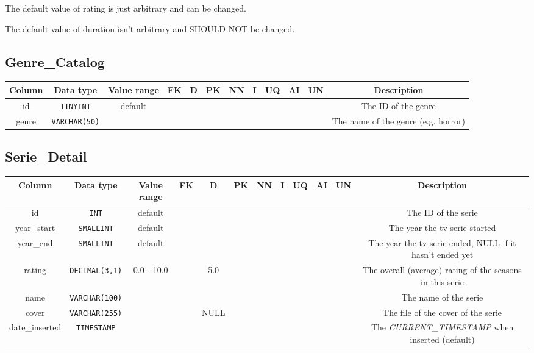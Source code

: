 \documentclass{article}
\newcommand{\dbtable}{\subsection}
\newcommand{\cmark}{\ding{51}}%
\newcommand{\mono}{\texttt}
\begin{document}
	The default value of rating is just arbitrary and can be changed.
	
	The default value of duration isn't arbitrary and SHOULD NOT be changed.
	

	\dbtable{Genre\_Catalog}
	\begin{table}[h!]
		\centering
		\begin{tabular}{|c|c|c|c|c|c|c|c|c|c|c|c|}
			\toprule
			\bfseries Column & \bfseries Data type & \bfseries Value range & \bfseries FK & \bfseries D & \bfseries PK & \bfseries NN & \bfseries I & \bfseries UQ & \bfseries AI & \bfseries UN & \bfseries Description\\
			
			\midrule
			id & \mono{TINYINT} & default & & & \cmark & \cmark & \cmark & \cmark & \cmark & \cmark & The ID of the genre\\
			
			\midrule
			genre & \mono{VARCHAR(50)} & & & & & \cmark & & \cmark & & & The name of the genre (e.g. horror)\\
			
			\bottomrule			
		\end{tabular}
	\end{table}

	\dbtable{Serie\_Detail}
	\begin{table}[h!]
		\centering
		\begin{tabular}{|c|c|c|c|c|c|c|c|c|c|c|c|}
			\toprule
			\bfseries Column & \bfseries Data type & \bfseries Value range & \bfseries FK & \bfseries D & \bfseries PK & \bfseries NN & \bfseries I & \bfseries UQ & \bfseries AI & \bfseries UN & \bfseries Description\\
			
			\midrule
			id & \mono{INT} & default & & & \cmark & \cmark & \cmark & \cmark & & \cmark & The ID of the serie\\
			
			\midrule
			year\_start & \mono{SMALLINT} & default & & & & \cmark & & & & \cmark & The year the tv serie started\\
			
			\midrule
			year\_end & \mono{SMALLINT} & default & & & & & & & & \cmark & The year the tv serie ended, NULL if it hasn't ended yet\\
			
			\midrule
			rating & \mono{DECIMAL(3,1)} & 0.0 - 10.0 & & 5.0 & & \cmark & & & & & The overall (average) rating of the seasons in this serie\\
			
			\midrule
			name & \mono{VARCHAR(100)} & & & & & \cmark & & & & & The name of the serie\\
			
			\midrule
			cover & \mono{VARCHAR(255)} & & & NULL & & & & & & & The file of the cover of the serie\\
			
			\midrule			
			date\_inserted & \mono{TIMESTAMP} & & & & & \cmark & & & & & The \textit{CURRENT\_TIMESTAMP} when inserted (default)\\
			
			\bottomrule
		\end{tabular}
	\end{table}
\end{document}

